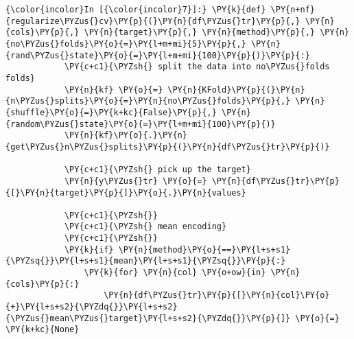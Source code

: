     \begin{Verbatim}[commandchars=\\\{\}]
{\color{incolor}In [{\color{incolor}7}]:} \PY{k}{def} \PY{n+nf}{regularize\PYZus{}cv}\PY{p}{(}\PY{n}{df\PYZus{}tr}\PY{p}{,} \PY{n}{cols}\PY{p}{,} \PY{n}{target}\PY{p}{,} \PY{n}{method}\PY{p}{,} \PY{n}{no\PYZus{}folds}\PY{o}{=}\PY{l+m+mi}{5}\PY{p}{,} \PY{n}{rand\PYZus{}state}\PY{o}{=}\PY{l+m+mi}{100}\PY{p}{)}\PY{p}{:}
            \PY{c+c1}{\PYZsh{} split the data into no\PYZus{}folds folds}
            \PY{n}{kf} \PY{o}{=} \PY{n}{KFold}\PY{p}{(}\PY{n}{n\PYZus{}splits}\PY{o}{=}\PY{n}{no\PYZus{}folds}\PY{p}{,} \PY{n}{shuffle}\PY{o}{=}\PY{k+kc}{False}\PY{p}{,} \PY{n}{random\PYZus{}state}\PY{o}{=}\PY{l+m+mi}{100}\PY{p}{)}
            \PY{n}{kf}\PY{o}{.}\PY{n}{get\PYZus{}n\PYZus{}splits}\PY{p}{(}\PY{n}{df\PYZus{}tr}\PY{p}{)}
            
            \PY{c+c1}{\PYZsh{} pick up the target}
            \PY{n}{y\PYZus{}tr} \PY{o}{=} \PY{n}{df\PYZus{}tr}\PY{p}{[}\PY{n}{target}\PY{p}{]}\PY{o}{.}\PY{n}{values}
            
            \PY{c+c1}{\PYZsh{}}
            \PY{c+c1}{\PYZsh{} mean encoding}
            \PY{c+c1}{\PYZsh{}}
            \PY{k}{if} \PY{n}{method}\PY{o}{==}\PY{l+s+s1}{\PYZsq{}}\PY{l+s+s1}{mean}\PY{l+s+s1}{\PYZsq{}}\PY{p}{:}
                \PY{k}{for} \PY{n}{col} \PY{o+ow}{in} \PY{n}{cols}\PY{p}{:}
                    \PY{n}{df\PYZus{}tr}\PY{p}{[}\PY{n}{col}\PY{o}{+}\PY{l+s+s2}{\PYZdq{}}\PY{l+s+s2}{\PYZus{}mean\PYZus{}target}\PY{l+s+s2}{\PYZdq{}}\PY{p}{]} \PY{o}{=} \PY{k+kc}{None}
        

\end{Verbatim}

